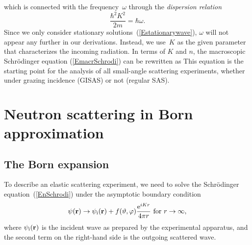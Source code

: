 %
which is connected with the frequency~$\omega$ through the
\textit{dispersion relation}
\begin{equation}
  \frac{\hbar^2 K^2}{2m} = \hbar\omega.
\end{equation}
Since we only consider stationary solutions~(\ref{Estationarywave}),
$\omega$ will not appear any further in our derivations.
Instead, we use~$K$ as the given parameter that characterizes the
incoming radiation.
In terms of $K$ and $n$,
the macroscopic Schrödinger equation (\ref{EmacrSchrodi})
can be rewritten as
This equation is the starting point for the analysis of all
small-angle scattering experiments,
whether under grazing incidence (GISAS) or not (regular SAS).
%
%

%
%

\section{Neutron scattering in Born approximation}

\subsection{The Born expansion}\label{SBorn}

%

To describe an elastic scattering experiment,
we need to solve the Schrödinger equation~(\ref{EnSchrodi})
under the asymptotic boundary condition
\begin{equation}\label{Escabouco}
  \psi(\mathbf{r})
  \to \psi_{\text{i}}(\mathbf{r}) + f(\vartheta,\varphi)\frac{\text{e}^{iKr}}{4\pi r}
  \text{~for~}r\to\infty,
\end{equation}
%
%
where $\psi_{\text{i}}(\mathbf{r})$ is the incident wave
as prepared by the experimental apparatus,
and the second term on the right-hand side is
the outgoing scattered wave.

